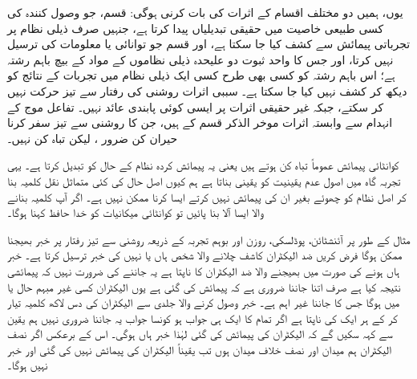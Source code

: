 یوں،  ہمیں دو  مختلف اقسام کے  اثرات کی بات کرنی ہوگی:   قسم،  جو وصول کنندہ کی کسی طبیعی خاصیت میں حقیقی تبدیلیاں پیدا کرتا ہے،  جنہیں صرف ذیلی نظام پر تجرباتی پیمائش سے کشف کیا جا سکتا ہے، اور  قسم  جو توانائی یا معلومات کی ترسیل نہیں کرتا،  اور جس کا  واحد ثبوت دو علیحدہ ذیلی نظاموں کے مواد کے بیچ باہم رشتہ ہے؛  اس باہم رشتہ کو کسی بھی طرح کسی ایک ذیلی نظام میں تجربات کے نتائج کو دیکھ کر کشف نہیں کیا جا سکتا ہے۔ سببی اثرات  روشنی کی رفتار سے تیز حرکت نہیں کر سکتے،  جبکہ غیر حقیقی   اثرات پر ایسی کوئی پابندی عائد نہیں۔ تفاعل موج کے انہدام سے وابستہ اثرات موخر الذکر قسم کے  ہیں،  جن  کا روشنی سے تیز سفر کرنا حیران کن ضرور ،  لیکن تباہ کن نہیں۔

کوانٹائی پیمائش عموماً تباہ کن ہوتے ہیں یعنی یہ پیمائش کردہ نظام کے حال کو تبدیل کرتا ہے۔ یہی تجربہ گاہ میں اصول عدم یقینیت کو یقینی بناتا ہے ہم کیوں اصل حال کی کئی متماثل نقل کلمیہ بنا کر اصل نظام کو چھوئے بغیر ان کی پیمائش نہیں کرتے ایسا کرنا ممکن نہیں ہے۔ اگر آپ کلمیہ بنانے والا ایسا آلا بنا پائیں تو کوانٹائی میکانیات کو خدا حافظ کہنا ہوگا۔

مثال کے طور پر آئنشٹائن، پوڈلسکی، روزن اور بوہم تجربہ کے ذریعہ روشنی سے تیز رفتار پر خبر بھیجنا ممکن ہوگا فرض کریں ضد الیکٹران کاشف چلانے والا شخص ہاں یا نہیں کی خبر ترسیل کرتا ہے۔ خبر ہاں ہونے کی صورت میں بھیجنے والا ضد الیکٹران کا  ناپتا ہے یہ جاننے کی ضرورت نہیں کہ پیمائشی نتیجہ کیا ہے صرف اتنا جاننا ضروری ہے کہ پیمائش کی گئی ہے یوں الیکٹران کسی غیر مبہم حال  یا  میں ہوگا جس کا جاننا غیر اہم ہے۔ خبر وصول کرنے والا جلدی سے الیکٹران کی دس لاکھ کلمیہ تیار کر کے ہر ایک کی  ناپتا ہے اگر تمام کا ایک ہی جواب ہو کونسا جواب یہ جاننا ضروری نہیں ہم یقین سے کہہ سکیں گے کہ الیکٹران کی پیمائش کی گئی لہٰذا خبر ہاں ہوگی۔ اس کے برعکس اگر نصف الیکٹران ہم میدان اور نصف خلاف میدان ہوں تب یقیناً الیکٹران کی پیمائش نہیں کی گئی اور خبر نہیں ہوگا۔

